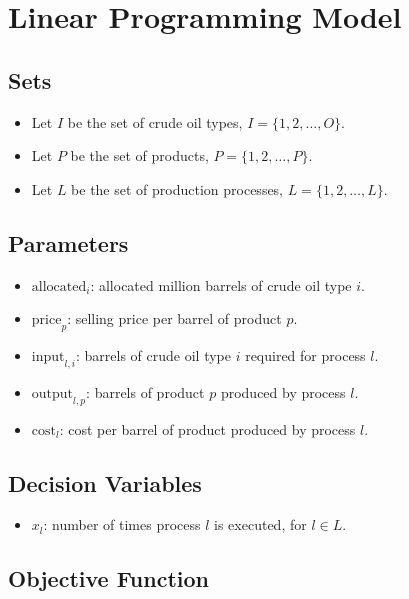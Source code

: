 \documentclass{article}
\begin{document}
\section*{Linear Programming Model}

\subsection*{Sets}

\begin{itemize}
    \item Let \( I \) be the set of crude oil types, \( I = \{1, 2, \ldots, O\} \).
    \item Let \( P \) be the set of products, \( P = \{1, 2, \ldots, P\} \).
    \item Let \( L \) be the set of production processes, \( L = \{1, 2, \ldots, L\} \).
\end{itemize}

\subsection*{Parameters}

\begin{itemize}
    \item \( \text{allocated}_i \): allocated million barrels of crude oil type \( i \).
    \item \( \text{price}_p \): selling price per barrel of product \( p \).
    \item \( \text{input}_{l,i} \): barrels of crude oil type \( i \) required for process \( l \).
    \item \( \text{output}_{l,p} \): barrels of product \( p \) produced by process \( l \).
    \item \( \text{cost}_l \): cost per barrel of product produced by process \( l \).
\end{itemize}

\subsection*{Decision Variables}

\begin{itemize}
    \item \( x_l \): number of times process \( l \) is executed, for \( l \in L \).
\end{itemize}

\subsection*{Objective Function}
\end{document}
